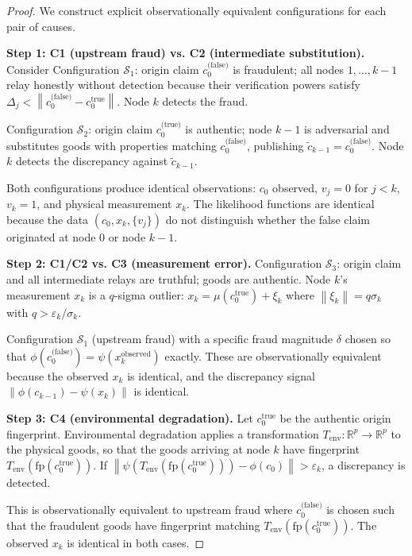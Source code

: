 \documentclass[11pt,a4paper]{article}
\theoremstyle{definition}
\theoremstyle{remark}
\newcommand{\R}{\mathbb{R}}
\newcommand{\norm}[1]{\left\lVert#1\right\rVert}
\begin{document}
\begin{proof}
We construct explicit observationally equivalent configurations for each pair of causes.

\textbf{Step 1: C1 (upstream fraud) vs. C2 (intermediate substitution).} Consider Configuration $\mathcal{S}_1$: origin claim $c_0^{\text{(false)}}$ is fraudulent; all nodes $1, \ldots, k-1$ relay honestly without detection because their verification powers satisfy $\Delta_j < \norm{c_0^{\text{(false)}} - c_0^{\text{true}}}$. Node $k$ detects the fraud.

Configuration $\mathcal{S}_2$: origin claim $c_0^{\text{(true)}}$ is authentic; node $k-1$ is adversarial and substitutes goods with properties matching $c_0^{\text{(false)}}$, publishing $\tilde{c}_{k-1} = c_0^{\text{(false)}}$. Node $k$ detects the discrepancy against $\tilde{c}_{k-1}$.

Both configurations produce identical observations: $c_0$ observed, $v_j = 0$ for $j < k$, $v_k = 1$, and physical measurement $x_k$. The likelihood functions are identical because the data $(c_0, x_k, \{v_j\})$ do not distinguish whether the false claim originated at node 0 or node $k-1$.

\textbf{Step 2: C1/C2 vs. C3 (measurement error).} Configuration $\mathcal{S}_3$: origin claim and all intermediate relays are truthful; goods are authentic. Node $k$'s measurement $x_k$ is a $q$-sigma outlier: $x_k = \mu(c_0^{\text{true}}) + \xi_k$ where $\norm{\xi_k} = q\sigma_k$ with $q > \varepsilon_k/\sigma_k$.

Configuration $\mathcal{S}_1$ (upstream fraud) with a specific fraud magnitude $\delta$ chosen so that $\phi(c_0^{\text{(false)}}) = \psi(x_k^{\text{observed}})$ exactly. These are observationally equivalent because the observed $x_k$ is identical, and the discrepancy signal $\norm{\phi(c_{k-1}) - \psi(x_k)}$ is identical.

\textbf{Step 3: C4 (environmental degradation).} Let $c_0^{\text{true}}$ be the authentic origin fingerprint. Environmental degradation applies a transformation $T_{\text{env}}: \R^p \to \R^p$ to the physical goods, so that the goods arriving at node $k$ have fingerprint $T_{\text{env}}(\text{fp}(c_0^{\text{true}}))$. If $\norm{\psi(T_{\text{env}}(\text{fp}(c_0^{\text{true}}))) - \phi(c_0)} > \varepsilon_k$, a discrepancy is detected.

This is observationally equivalent to upstream fraud where $c_0^{\text{(false)}}$ is chosen such that the fraudulent goods have fingerprint matching $T_{\text{env}}(\text{fp}(c_0^{\text{true}}))$. The observed $x_k$ is identical in both cases.


\end{proof}
\end{document}
